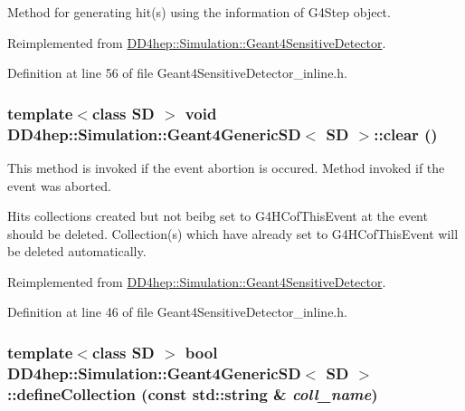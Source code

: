 Method for generating hit(s) using the information of G4Step object. 

Reimplemented from \hyperlink{class_d_d4hep_1_1_simulation_1_1_geant4_sensitive_detector_a96d4594c8e1af23ef5c572938460670e}{DD4hep::Simulation::Geant4SensitiveDetector}.

Definition at line 56 of file Geant4SensitiveDetector\_\-inline.h.\hypertarget{class_d_d4hep_1_1_simulation_1_1_geant4_generic_s_d_acf8f9146d5683a8131fc5d8ee26d7f01}{
\subsubsection[{clear}]{\setlength{\rightskip}{0pt plus 5cm}template$<$class SD $>$ void {\bf DD4hep::Simulation::Geant4GenericSD}$<$ SD $>$::clear ()}}
\label{class_d_d4hep_1_1_simulation_1_1_geant4_generic_s_d_acf8f9146d5683a8131fc5d8ee26d7f01}


This method is invoked if the event abortion is occured. Method invoked if the event was aborted.

Hits collections created but not beibg set to G4HCofThisEvent at the event should be deleted. Collection(s) which have already set to G4HCofThisEvent will be deleted automatically. 

Reimplemented from \hyperlink{class_d_d4hep_1_1_simulation_1_1_geant4_sensitive_detector_a594a8e0083028c98326f99ace2f0f8dd}{DD4hep::Simulation::Geant4SensitiveDetector}.

Definition at line 46 of file Geant4SensitiveDetector\_\-inline.h.\hypertarget{class_d_d4hep_1_1_simulation_1_1_geant4_generic_s_d_a3c70c7c1f1be8bd0e6364327e28228e4}{
\subsubsection[{defineCollection}]{\setlength{\rightskip}{0pt plus 5cm}template$<$class SD $>$ bool {\bf DD4hep::Simulation::Geant4GenericSD}$<$ SD $>$::defineCollection (const std::string \& {\em coll\_\-name})}}
\label{class_d_d4hep_1_1_simulation_1_1_geant4_generic_s_d_a3c70c7c1f1be8bd0e6364327e28228e4}


